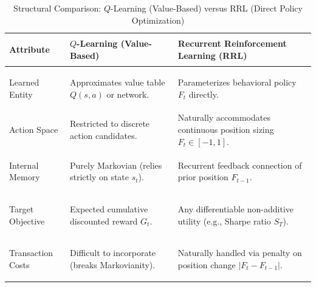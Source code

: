 \begin{table}[!htbp]
\centering
\caption{Structural Comparison: \texorpdfstring{$Q$-Learning}{Q-Learning} (Value-Based) versus RRL (Direct Policy Optimization)}
\label{tab:qlearning_vs_rrl}
\vspace{0.2em}
\renewcommand{\arraystretch}{1.3}
\begin{tabularx}{\textwidth}{>{\bfseries\raggedright\arraybackslash}p{3.4cm}XX}
\toprule
Attribute & \texorpdfstring{$Q$-Learning}{Q-Learning} (Value-Based) & Recurrent Reinforcement Learning (RRL) \\
\midrule
Learned Entity & Approximates value table $Q(s, a)$ or network. & Parameterizes behavioral policy $F_t$ directly. \\
Action Space & Restricted to discrete action candidates. & Naturally accommodates continuous position sizing $F_t \in [-1, 1]$. \\
Internal Memory & Purely Markovian (relies strictly on state $s_t$). & Recurrent feedback connection of prior position $F_{t-1}$. \\
Target Objective & Expected cumulative discounted reward $G_t$. & Any differentiable non-additive utility (e.g., Sharpe ratio $S_T$). \\
Transaction Costs & Difficult to incorporate (breaks Markovianity). & Naturally handled via penalty on position change $|F_t - F_{t-1}|$. \\
\bottomrule
\end{tabularx}
\end{table}
